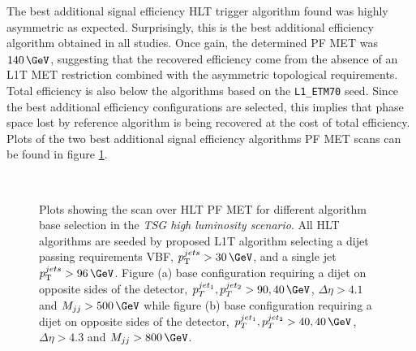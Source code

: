 The best additional signal efficiency \gls{HLT} trigger algorithm found was highly asymmetric as expected. Surprisingly, this is the best additional efficiency algorithm obtained in all studies. Once gain, the determined \gls{PF} \gls{MET} was $140\,\GeV$, suggesting that the recovered efficiency come from the absence of an \gls{L1T} \gls{MET} restriction combined with the asymmetric topological requirements. Total efficiency is also below the algorithms based on the \verb|L1_ETM70| seed. Since the best additional efficiency configurations are selected, this implies that phase space lost by reference algorithm is being recovered at the cost of total efficiency. Plots of the two best additional signal efficiency algorithms \gls{PF} \gls{MET} scans can be found in figure \ref{FIGURE:RunIITriggerStudies_HLT_Seed_L1TDijetSingleJet}.

\begin{figure}[!htp]%
\centering
{}\qquad
{}\\
\caption{Plots showing the scan over \gls{HLT} \gls{PF} \gls{MET} for different algorithm base selection in the \textit{\gls{TSG} high luminosity scenario}. All \gls{HLT} algorithms are seeded by proposed \gls{L1T} algorithm selecting a dijet passing requirements \gls{VBF}, $\pt^{jets}>30\,\GeV$, and a single jet $\pt^{jets}>96\,\GeV$. Figure (a) base configuration requiring a dijet on opposite sides of the detector, $p_T^{jet_1},p_T^{jet_2}>90,40\,\GeV$, $\Delta\eta>4.1$ and $M_{jj}>500\,\GeV$ while figure (b) base configuration requiring a dijet on opposite sides of the detector, $p_T^{jet_1},p_T^{jet_2}>40,40\,\GeV$, $\Delta\eta>4.3$ and $M_{jj}>800\,\GeV$.}
\label{FIGURE:RunIITriggerStudies_HLT_Seed_L1TDijetSingleJet}
\end{figure}

